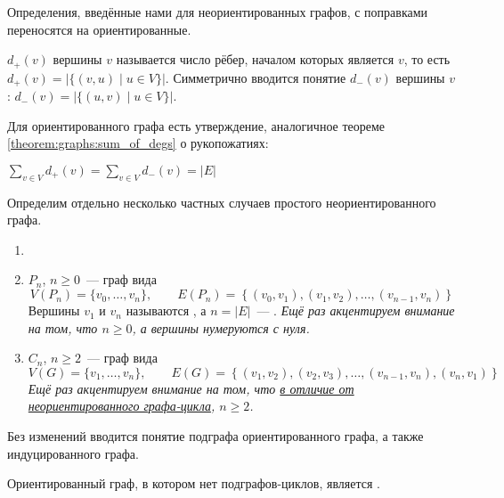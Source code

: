 Определения, введённые нами для неориентированных графов, с поправками переносятся на ориентированные.

\begin{definition}
     $ d_+(v) $ вершины $ v $ называется число рёбер, началом которых является $ v $,
    то есть $ d_+(v) = |\{ (v, u) \mid u \in V \}| $.
    Симметрично вводится понятие  $ d_-(v) $ вершины $ v $: $ d_-(v) = |\{ (u, v) \mid u \in V \}| $.
\end{definition}

Для ориентированного графа есть утверждение, аналогичное теореме \ref{theorem:graphs:sum_of_degs} о рукопожатиях:

\begin{statement}
    $ \displaystyle \sum_{v \in V} d_+(v) = \sum_{v \in V} d_-(v) = |E| $
\end{statement}

Определим отдельно несколько частных случаев простого неориентированного графа.
\begin{definition}
    \begin{enumerate}[label=\arabic*)]
        \item[]
        \item
             $ P_n $, $ n \geqslant 0 $~--- граф вида
            \[
                V(P_n) = \{ v_0, \ldots, v_n \}, \qquad
                E(P_n) = \left\{ (v_0, v_1), (v_1, v_2), \ldots, (v_{n-1}, v_n) \right\}
            \]
            Вершины $ v_1 $ и $ v_n $ называются , а $ n = |E| $~--- .
            \textit{Ещё раз акцентируем внимание на том, что $ n \geqslant 0 $, а вершины нумеруются с нуля.}
        \item
             $ C_n $, $ n \geqslant 2 $~--- граф вида
            \[
                V(G) = \{ v_1, \ldots, v_n \}, \qquad
                E(G) = \left\{ (v_1, v_2), (v_2, v_3), \ldots, (v_{n-1}, v_n), (v_n, v_1) \right\}
            \]
            \textit{Ещё раз акцентируем внимание на том, что \uline{в отличие от неориентированного графа-цикла}, $ n \geqslant 2 $.}
    \end{enumerate}
\end{definition}

Без изменений вводится понятие подграфа ориентированного графа, а также индуцированного графа.

\begin{definition}
    Ориентированный граф, в котором нет подграфов-циклов, является .
\end{definition}

